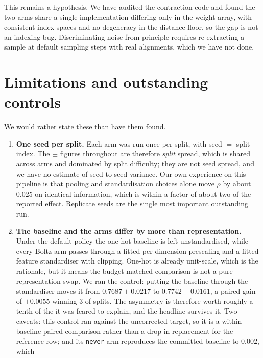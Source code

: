 \documentclass[11pt,a4paper]{article}
\begin{document}
This remains a hypothesis. We have audited the contraction code and found the
two arms share a single implementation differing only in the weight array, with
consistent index spaces and no degeneracy in the distance floor, so the gap is
not an indexing bug. Discriminating noise from principle requires re-extracting
a sample at default sampling steps with real alignments, which we have not done.

\section{Limitations and outstanding controls}
\label{sec:limits}

We would rather state these than have them found.

\begin{enumerate}
  \item \textbf{One seed per split.} Each arm was run once per split, with
        seed $=$ split index. The $\pm$ figures throughout are therefore
        \emph{split} spread, which is shared across arms and dominated by split
        difficulty; they are not seed spread, and we have no estimate of
        seed-to-seed variance. Our own experience on this pipeline is that
        pooling and standardisation choices alone move $\rho$ by about $0.025$
        on identical information, which is within a factor of about two of the
        reported effect. Replicate seeds are the single most important
        outstanding run.
  \item \textbf{The baseline and the arms differ by more than representation.}
        Under the default policy the one-hot baseline is left unstandardised,
        while every Boltz arm passes through a fitted per-dimension prescaling
        and a fitted feature standardiser with clipping. One-hot is already
        unit-scale, which is the rationale, but it means the budget-matched
        comparison is not a pure representation swap. We ran the control:
        putting the baseline through the standardiser moves it from
        $0.7687 \pm 0.0217$ to $0.7742 \pm 0.0161$, a paired gain of
        $+0.0055$ winning 3 of \nsplits{} splits. The asymmetry is therefore
        worth roughly a tenth of the \bzzupcadelta{} it was feared to explain,
        and the headline survives it. Two caveats: this control ran against the
        uncorrected target, so it is a within-baseline paired comparison rather
        than a drop-in replacement for the reference row; and its
        \texttt{never} arm reproduces the committed baseline to $0.002$, which

\end{enumerate}
\end{document}
